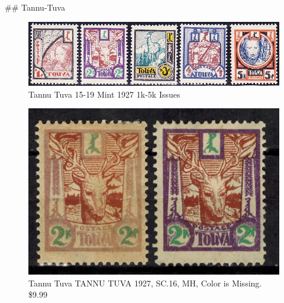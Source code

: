 \#\# Tannu-Tuva

\begin{fullwidth}
\begin{figure}[htp]
\includegraphics[width=.95\textwidth]{../tannu-tuva/TannuTuva-15-19.jpg}
\caption{Tannu Tuva 15-19 Mint 1927 1k-5k Issues }
\end{figure}
\end{fullwidth}

\begin{figure}[htp]
\includegraphics[width=.50\textwidth]{../tannu-tuva/1927-error.jpg}
\caption{Tannu Tuva TANNU TUVA 1927, SC.16, MH, Color is Missing. \$9.99 }
\end{figure}








                                                    